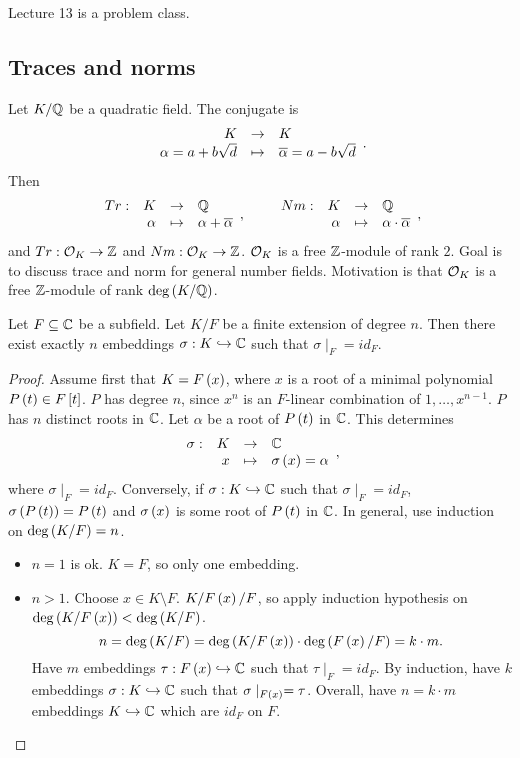 
Lecture 13 is a problem class.

\pagebreak

\subsection{Traces and norms}


Let $ K / \mathbb{Q} $ be a quadratic field. The conjugate is
$$ \function{K}{K}{\alpha = a + b\sqrt{d}}{\overline{\alpha} = a - b\sqrt{d}}. $$
Then
$$ \function[Tr]{K}{\Q}{\alpha}{\alpha + \overline{\alpha}}, \qquad \function[Nm]{K}{\Q}{\alpha}{\alpha \cdot \overline{\alpha}}, $$
and $ Tr : \mathcal{O}_K \to \mathbb{Z} $ and $ Nm : \mathcal{O}_K \to \mathbb{Z} $. $ \mathcal{O}_K $ is a free $ \mathbb{Z} $-module of rank $ 2 $. Goal is to discuss trace and norm for general number fields. Motivation is that $ \mathcal{O}_K $ is a free $ \mathbb{Z} $-module of rank $ \deg\left( K / \mathbb{Q} \right) $.

\begin{proposition}
\label{prop:embeddings}
Let $ F \subseteq \mathbb{C} $ be a subfield. Let $ K / F $ be a finite extension of degree $ n $. Then there exist exactly $ n $ embeddings $ \sigma : K \hookrightarrow \mathbb{C} $ such that $ \sigma \mid_F = id_F $.
\end{proposition}

\begin{proof}
Assume first that $ K = F\left( x \right) $, where $ x $ is a root of a minimal polynomial $ P\left( t \right) \in F\left[ t \right] $. $ P $ has degree $ n $, since $ x^n $ is an $ F $-linear combination of $ 1, \dots, x^{n - 1} $. $ P $ has $ n $ distinct roots in $ \mathbb{C} $. Let $ \alpha $ be a root of $ P\left( t \right) $ in $ \mathbb{C} $. This determines
$$ \function[\sigma]{K}{\C}{x}{\sigma\rb{x} = \alpha}, $$
where $ \sigma \mid_F = id_F $. Conversely, if $ \sigma : K \hookrightarrow \mathbb{C} $ such that $ \sigma \mid_F = id_F $, $ \sigma\left( P\left( t \right) \right) = P\left( t \right) $ and $ \sigma\left( x \right) $ is some root of $ P\left( t \right) $ in $ \mathbb{C} $. In general, use induction on $ \deg\left( K / F \right) = n $.
\begin{itemize}
\item $ n = 1 $ is ok. $ K = F $, so only one embedding.
\item $ n > 1 $. Choose $ x \in K \setminus F $. $ K / F\left( x \right) / F $, so apply induction hypothesis on $ \deg\left( K / F\left( x \right) \right) < \deg\left( K / F \right) $.
$$ n = \deg\left( K / F \right) = \deg\left( K / F\left( x \right) \right) \cdot \deg\left( F\left( x \right) / F \right) = k \cdot m. $$
Have $ m $ embeddings $ \tau : F\left( x \right) \hookrightarrow \mathbb{C} $ such that $ \tau \mid_F = id_F $. By induction, have $ k $ embeddings $ \sigma : K \hookrightarrow \mathbb{C} $ such that $ \sigma \mid_{F\left( x \right)} = \tau $. Overall, have $ n = k \cdot m $ embeddings $ K \hookrightarrow \mathbb{C} $ which are $ id_F $ on $ F $.
\end{itemize}
\end{proof}

